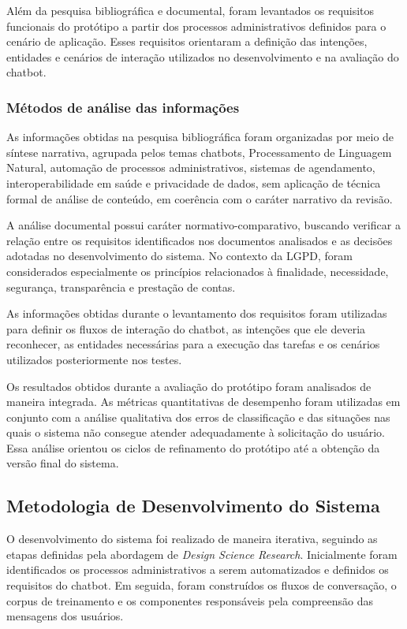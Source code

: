 \documentclass[12pt,a4paper]{extarticle}
\begin{document}
Além da pesquisa bibliográfica e documental, foram levantados os requisitos funcionais do protótipo a partir dos processos administrativos definidos para o cenário de aplicação. Esses requisitos orientaram a definição das intenções, entidades e cenários de interação utilizados no desenvolvimento e na avaliação do chatbot.

\subsubsection{Métodos de análise das informações}

As informações obtidas na pesquisa bibliográfica foram organizadas por meio de síntese narrativa, agrupada pelos temas chatbots, Processamento de Linguagem Natural, automação de processos administrativos, sistemas de agendamento, interoperabilidade em saúde e privacidade de dados, sem aplicação de técnica formal de análise de conteúdo, em coerência com o caráter narrativo da revisão.

A análise documental possui caráter normativo-comparativo, buscando verificar a relação entre os requisitos identificados nos documentos analisados e as decisões adotadas no desenvolvimento do sistema. No contexto da LGPD, foram considerados especialmente os princípios relacionados à finalidade, necessidade, segurança, transparência e prestação de contas.

As informações obtidas durante o levantamento dos requisitos foram utilizadas para definir os fluxos de interação do chatbot, as intenções que ele deveria reconhecer, as entidades necessárias para a execução das tarefas e os cenários utilizados posteriormente nos testes.

Os resultados obtidos durante a avaliação do protótipo foram analisados de maneira integrada. As métricas quantitativas de desempenho foram utilizadas em conjunto com a análise qualitativa dos erros de classificação e das situações nas quais o sistema não consegue atender adequadamente à solicitação do usuário. Essa análise orientou os ciclos de refinamento do protótipo até a obtenção da versão final do sistema.

\subsection{Metodologia de Desenvolvimento do Sistema}

O desenvolvimento do sistema foi realizado de maneira iterativa, seguindo as etapas definidas pela abordagem de \textit{Design Science Research}. Inicialmente foram identificados os processos administrativos a serem automatizados e definidos os requisitos do chatbot. Em seguida, foram construídos os fluxos de conversação, o corpus de treinamento e os componentes responsáveis pela compreensão das mensagens dos usuários.
\end{document}
